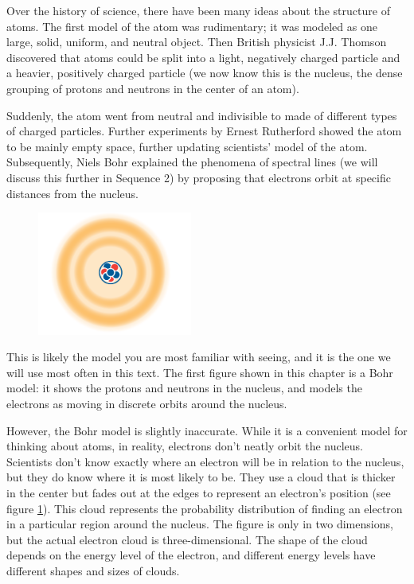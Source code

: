 Over the history of science, there have been many ideas about the structure of
atoms. The first model of the atom was rudimentary; it was modeled as one large, solid,
uniform, and neutral object. Then British physicist J.J. Thomson discovered that
atoms could be split into a light, negatively charged particle and a heavier,
positively charged particle (we now know this is the nucleus, the dense
grouping of protons and neutrons in the center of an atom).

Suddenly, the atom went from neutral and indivisible to made of different types
of charged particles. Further experiments by Ernest Rutherford showed the atom
to be mainly empty space, further updating scientists' model of the atom.
Subsequently, Niels Bohr explained the phenomena of spectral lines (we will discuss
this further in Sequence 2) by proposing that electrons
orbit at specific distances from the nucleus.

\begin{figure}
\noindent\includegraphics[width=2in]{atomCloud.png}
\caption{}
\label{fig:atomCloud}
\end{figure}

This is likely the model you are most familiar with seeing, and it is the one we
will use most often in this text. The first figure shown in this chapter is a Bohr
model: it shows the protons and neutrons in the nucleus, and models the electrons 
as moving in discrete orbits around the nucleus. 

However, the Bohr model is slightly inaccurate. While it is a convenient model for
thinking about atoms, in reality, electrons don't neatly orbit the nucleus.
Scientists don't know exactly where an electron will be in relation to the
nucleus, but they do know where it is most likely to be. They use a cloud that is
thicker in the center but fades out at the edges to represent an electron's
position (see figure \ref{fig:atomCloud}).  This cloud represents the probability
distribution of finding an electron in a particular region around the nucleus. The
figure is only in two dimensions, but the actual electron cloud is three-dimensional.
The shape of the cloud depends on the energy level of the electron, and different
energy levels have different shapes and sizes of clouds.

